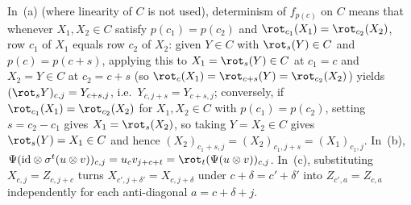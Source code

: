 \begin{outline}
In~(a) (where linearity of $C$ is not used), determinism of $f_{p(c)}$ on $C$ means that whenever
$X_1, X_2 \in C$ satisfy $p(c_1) = p(c_2)$ and $\rot_{c_1}(X_1) = \rot_{c_2}(X_2)$, row $c_1$ of $X_1$
equals row $c_2$ of $X_2$: given $Y \in C$ with $\rot_s(Y) \in C$ and $p(c) = p(c+s)$, applying this
to $X_1 = \rot_s(Y) \in C$ at $c_1 = c$ and $X_2 = Y \in C$ at $c_2 = c + s$ (so
$\rot_c(X_1) = \rot_{c+s}(Y) = \rot_{c_2}(X_2)$) yields $(\rot_s Y)_{c, j} = Y_{c+s, j}$, i.e.\
$Y_{c, j+s} = Y_{c+s, j}$; conversely, if $\rot_{c_1}(X_1) = \rot_{c_2}(X_2)$ for $X_1, X_2 \in C$ with
$p(c_1) = p(c_2)$, setting $s = c_2 - c_1$ gives $X_1 = \rot_s(X_2)$, so taking $Y = X_2 \in C$ gives
$\rot_s(Y) = X_1 \in C$ and hence $(X_2)_{c_1+s, j} = (X_2)_{c_1, j+s} = (X_1)_{c_1, j}$. In~(b),
$\Psi(\mathrm{id} \otimes \sigma^t(u \otimes v))_{c,j} = u_c v_{j+c+t} = \rot_t(\Psi(u\otimes v))_{c,j}$.
In~(c), substituting $X_{c,j} = Z_{c, j+c}$ turns $X_{c', j+\delta'} = X_{c, j+\delta}$ under
$c + \delta = c' + \delta'$ into $Z_{c', a} = Z_{c, a}$ independently for each anti-diagonal
$a = c + \delta + j$.
\end{outline}

